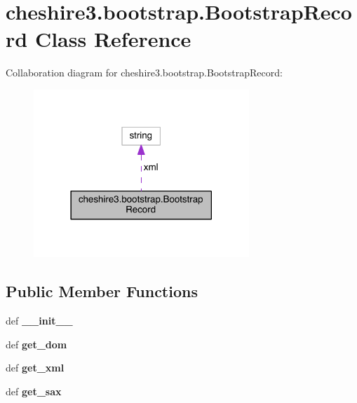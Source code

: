 \hypertarget{classcheshire3_1_1bootstrap_1_1_bootstrap_record}{\section{cheshire3.\-bootstrap.\-Bootstrap\-Record Class Reference}
\label{classcheshire3_1_1bootstrap_1_1_bootstrap_record}
}


Collaboration diagram for cheshire3.\-bootstrap.\-Bootstrap\-Record\-:
\nopagebreak
\begin{figure}[H]
\begin{center}
\leavevmode
\includegraphics[width=230pt]{classcheshire3_1_1bootstrap_1_1_bootstrap_record__coll__graph}
\end{center}
\end{figure}
\subsection*{Public Member Functions}
\begin{DoxyCompactItemize}
\item 
\hypertarget{classcheshire3_1_1bootstrap_1_1_bootstrap_record_a742830de9f0fbb24f630c583bff89604}{def {\bfseries \-\_\-\-\_\-init\-\_\-\-\_\-}}\label{classcheshire3_1_1bootstrap_1_1_bootstrap_record_a742830de9f0fbb24f630c583bff89604}

\item 
\hypertarget{classcheshire3_1_1bootstrap_1_1_bootstrap_record_a265487de1168f4ee4e67890e0966deca}{def {\bfseries get\-\_\-dom}}\label{classcheshire3_1_1bootstrap_1_1_bootstrap_record_a265487de1168f4ee4e67890e0966deca}

\item 
\hypertarget{classcheshire3_1_1bootstrap_1_1_bootstrap_record_a6c7bf661e25fefaf6e6f6fe04179e9ec}{def {\bfseries get\-\_\-xml}}\label{classcheshire3_1_1bootstrap_1_1_bootstrap_record_a6c7bf661e25fefaf6e6f6fe04179e9ec}

\item 
\hypertarget{classcheshire3_1_1bootstrap_1_1_bootstrap_record_a88b0c5cb6b2d26297713a2f528e40261}{def {\bfseries get\-\_\-sax}}\label{classcheshire3_1_1bootstrap_1_1_bootstrap_record_a88b0c5cb6b2d26297713a2f528e40261}

\end{DoxyCompactItemize}
